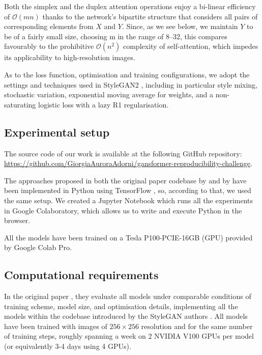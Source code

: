 \documentclass{article}
\begin{document}
Both the simplex and the duplex attention operations enjoy a bi-linear efficiency of 
$\mathcal{O}(mn)$ thanks to the network’s bipartite structure that considers all pairs of 
corresponding elements from $X$ and $Y$. Since, as we see below, we maintain $Y$ to be of a fairly 
small size, choosing m in the range of 8–32, this compares favourably to the prohibitive 	
$\mathcal{O}(n^2)$  complexity of self-attention, which impedes its applicability to high-resolution 
images.

As to the loss function, optimisation and training configurations, we adopt the settings and 
techniques used in StyleGAN2 \cite{karras2020analyzing}, including in particular style mixing, 
stochastic variation, exponential moving average for weights, and a non-saturating logistic loss with 
a lazy R1 regularisation.

\subsection{Experimental setup}	
The source code of our work is available at the following GitHub repository: 
\url{https://github.com/GiorgiaAuroraAdorni/gansformer-reproducibility-challenge}.

The approaches proposed in both the original paper codebase by \citet{karras2020analyzing} and 
by \citet{hudson2021generative} have been implemented in Python using TensorFlow 
\cite{tensorflow2015-whitepaper}, so, according to that, we used the same setup.
We created a Jupyter Notebook which runs all the experiments in Google Colaboratory, which 
allows us to write and execute Python in the browser. 

All the models have been trained on a Tesla P100-PCIE-16GB (GPU) provided by Google 
Colab Pro.

\subsection{Computational requirements}\label{sec:comput_req}

In the original paper \cite{hudson2021generative}, they evaluate all models under comparable 
conditions of training scheme, model size, and optimisation details, implementing all the models 
within the codebase introduced by the StyleGAN authors \cite{karras2020analyzing}. 
All models have been trained with images of $256\times 256$  resolution and for the 
same number of training steps, roughly spanning a week on 2 NVIDIA V100 GPUs per model (or 
equivalently 3-4 days using 4 GPUs). 
\end{document}

